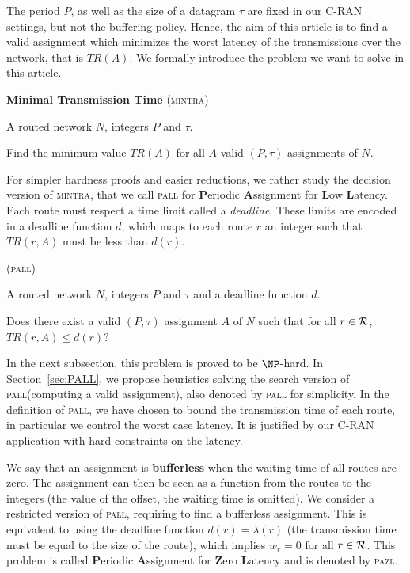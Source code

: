 \documentclass[a4paper,10pt]{journal}
\newcommand\pazl{\textsc{pazl}\xspace}
\newcommand\pall{\textsc{pall}\xspace}
\newcommand\mintra{\textsc{mintra}\xspace}
\begin{document}
      The period $P$, as well as the size of a datagram $\tau$ are fixed in our C-RAN settings, but not the buffering policy. Hence, the aim of this article is to find a valid assignment which minimizes the worst latency of the transmissions over the network, that is $TR(A)$. We formally introduce the problem we want to solve in this article. 

      \bigskip

      \noindent \textbf{ Minimal Transmission Time }(\mintra)

       A routed network $N$, integers $P$ and $\tau$.
      
       Find the minimum value $TR(A)$ for all $A$ valid $(P,\tau)$ assignments of $N$. 
      \bigskip

      For simpler hardness proofs and easier reductions, we rather study the decision version of \mintra, that we call \pall for \textbf{P}eriodic \textbf{A}ssignment for \textbf{L}ow \textbf{L}atency. Each route must respect a time limit called a \emph{deadline}. These limits are encoded in a deadline function $d$, which maps to each route $r$ an integer such that $TR(r,A)$ must be less than $d(r)$.
      

      \bigskip

       (\pall)

        A routed network $N$, integers $P$ and $\tau$ and a deadline function $d$.
      
       Does there exist a valid $(P,\tau)$ assignment $A$ of $N$ such that for all $r \in {\cal R}$, $TR(r,A) \leq d(r)$?
      \bigskip

	  In the next subsection, this problem is proved to be $\NP$-hard. In Section~\ref{sec:PALL}, we propose heuristics solving the search version of \pall (computing a valid assignment), also denoted by \pall for simplicity. In the definition of \pall, we have chosen to bound the transmission time of each route, in particular we control the worst case latency. It is justified by our C-RAN application with hard constraints on the latency. 

	 We say that an assignment is \textbf{bufferless} when the waiting time of all routes are zero.
	 The assignment can then be seen as a function from the routes to the integers (the value of the offset, the waiting time is omitted). We consider a restricted version of \pall, requiring to find a bufferless assignment. This is equivalent to using the deadline function $d(r) = \lambda(r)$ (the transmission time must be equal to the size of the route), which implies $w_r = 0$ for all $r \in \cal{R}$. This problem is called \textbf{P}eriodic \textbf{A}ssignment for \textbf{Z}ero \textbf{L}atency and is denoted by \pazl. 
\end{document}
